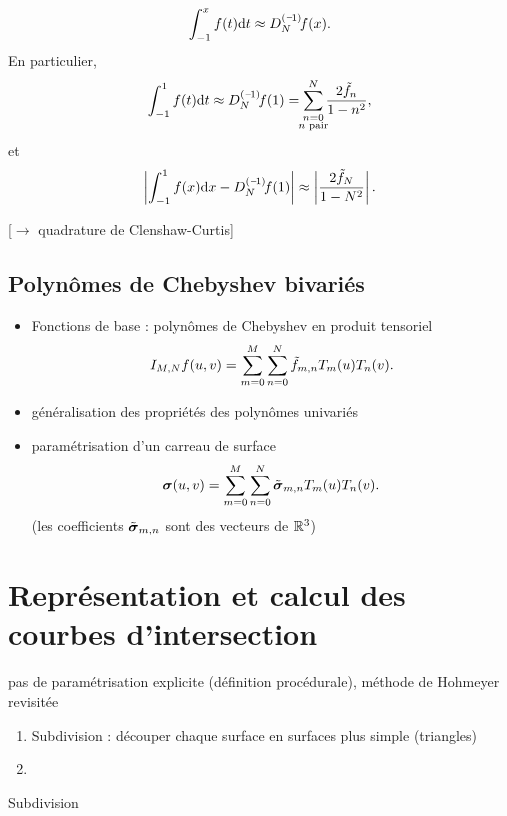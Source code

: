 \begin{equation}
	\int_{-1}^{x} f(t) \dx{t} 
	\approx \interpprim{f}{N}(x).
\end{equation}
En particulier,
\begin{equation}
	\int_{-1}^{1} f(t) \dx{t} 
	\approx 
	\interpprim{f}{N}(1)
	=
	\sum_{\mathclap{\substack{n = 0\\n \text{ pair}}}}^{N} \frac{2 \tilde{f}_n}{1 - n^2},
\end{equation}
et
\begin{equation}
	\left| \int_{-1}^{1} f(x) \dx{x} - \interpprim{f}{N}(1) \right|
	\approx
	\left|\frac{2 \tilde{f}_{N}}{1 - N^2}\right|.
\end{equation}

[$\to$ quadrature de Clenshaw-Curtis]








\subsection{Polynômes de Chebyshev bivariés}
\begin{itemize}
	\item Fonctions de base : polynômes de Chebyshev en produit tensoriel
	\[ \interpolant{f}{M,N}(u,v) = \sum_{m=0}^{M} \sum_{n=0}^{N} \tilde{f}_{m,n} T_m(u) T_n(v). \]
	\item généralisation des propriétés des polynômes univariés
	\item paramétrisation d'un carreau de surface
	\begin{equation}
		\bs(u,v) = \sum_{m=0}^{M} \sum_{n=0}^{N} \tilde{\bs}_{m,n} T_m(u) T_n(v).
	\end{equation}
	(les coefficients $\tilde{\bs}_{m,n}$ sont des vecteurs de $\reals^3$)
\end{itemize}

%

\section{Représentation et calcul des courbes d'intersection}
pas de paramétrisation explicite (définition procédurale), méthode de Hohmeyer revisitée

\begin{enumerate}
	\item Subdivision : découper chaque surface en surfaces plus simple (\eg triangles) 
	\item 
\end{enumerate}
Subdivision





